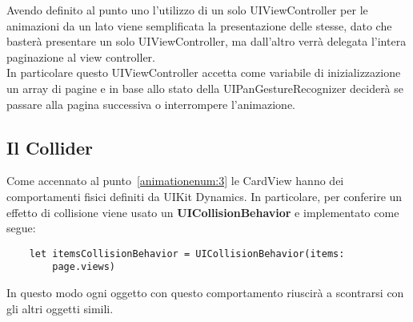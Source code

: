Avendo definito al punto uno l'utilizzo di un solo UIViewController per le animazioni da un lato viene semplificata
la presentazione delle stesse, dato che basterà presentare un solo UIViewController, ma dall'altro verrà delegata
l'intera paginazione al view controller. \\

In particolare questo UIViewController accetta come variabile di inizializzazione
un array di pagine e in base allo stato della UIPanGestureRecognizer deciderà se passare alla pagina successiva
o interrompere l'animazione.

\subsection{Il Collider}

Come accennato al punto~\ref{animationenum:3} le CardView hanno dei comportamenti fisici definiti
da UIKit Dynamics. In particolare, per conferire un effetto di collisione viene usato un \textbf{UICollisionBehavior} e implementato come segue:

\begin{verbatim}
    let itemsCollisionBehavior = UICollisionBehavior(items:
        page.views)
\end{verbatim}

In questo modo ogni oggetto con questo
comportamento riuscirà a scontrarsi con gli altri oggetti simili.
